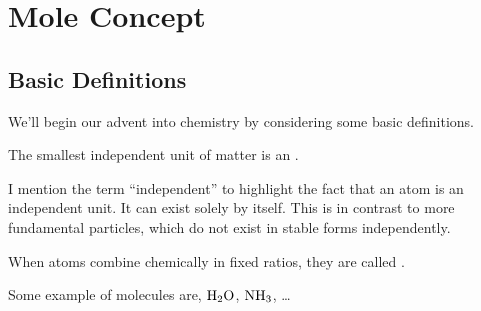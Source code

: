 \chapter{Mole Concept}

\section{Basic Definitions}

We'll begin our advent into chemistry by considering some basic definitions.


\begin{definition}
    The smallest independent unit of matter is an .
\end{definition}

I mention the term ``independent'' to highlight the fact that an atom is an independent unit. It can exist solely by itself. This is in contrast to 
more fundamental particles, which do not exist in stable forms independently.  

\begin{definition}
    When atoms combine chemically in fixed ratios, they are called .
\end{definition}

Some example of molecules are, \(\ce{H2O}\), \(\ce{NH3}\), \dots